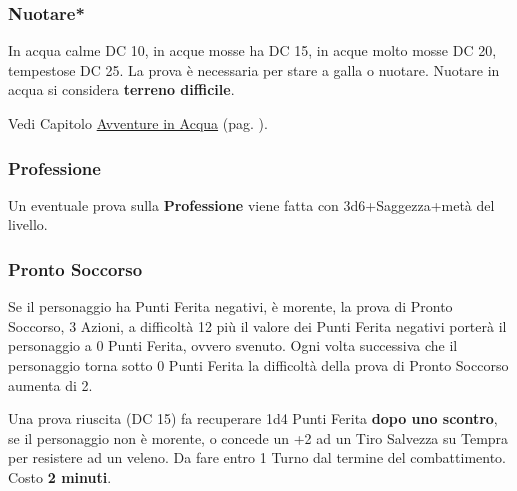 \begin{multicols}{2}
\titlespacing*{\subsubsection}{0pt}{0.5em}{0.5em}\subsubsection*{Nuotare*}\label{compnuotare}

In acqua calme DC 10, in acque mosse ha DC 15, in acque molto mosse DC 20, tempestose DC 25. La prova è necessaria per stare a galla o nuotare. Nuotare in acqua si considera \textbf{terreno difficile}.

Vedi Capitolo \hyperlink{combatteresottacqua}{Avventure in Acqua} (pag. \pageref{combatteresottacqua}).

\titlespacing*{\subsubsection}{0pt}{0.5em}{0.5em}\subsubsection*{Professione}
Un eventuale prova sulla \textbf{Professione} viene fatta con 3d6+Saggezza+metà del livello.


\titlespacing*{\subsubsection}{0pt}{0.5em}{0.5em}\subsubsection*{Pronto Soccorso}\hypertarget{prontosoccorso}{}\label{prontosoccorso}

Se il personaggio ha Punti Ferita negativi, è morente, la prova di Pronto Soccorso, 3 Azioni, a difficoltà 12 più il valore dei Punti Ferita negativi porterà il personaggio a 0 Punti Ferita, ovvero svenuto. Ogni volta successiva che il personaggio torna sotto 0 Punti Ferita la difficoltà della prova di Pronto Soccorso aumenta di 2.

Una prova riuscita (DC 15) fa recuperare 1d4 Punti Ferita \textbf{dopo uno scontro}, se il personaggio non è morente, o concede un +2 ad un Tiro Salvezza su Tempra per resistere ad un veleno. Da fare entro 1 Turno dal termine del combattimento. Costo \textbf{2 minuti}.


\end{multicols}
